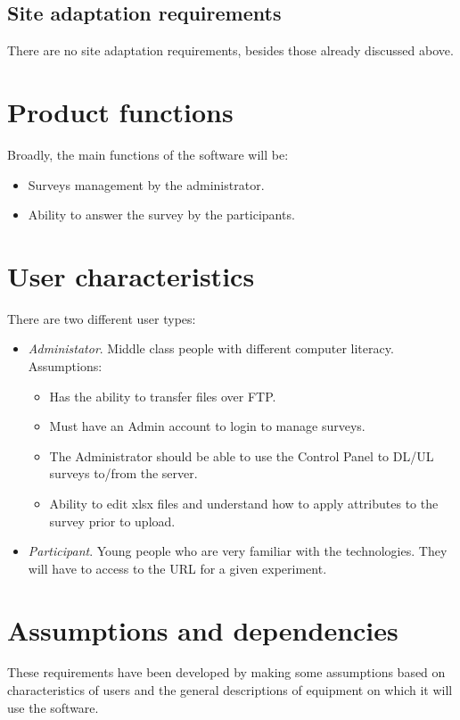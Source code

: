 \documentclass[a4paper,12pt,oneside]{report}
\begin{document}
\subsection{Site adaptation requirements}
There are no site adaptation requirements, besides those already discussed above.

\section{Product functions}
Broadly, the main functions of the software will be:
\begin{itemize}
\item Surveys management by the administrator.
\item Ability to answer the survey by the participants.
\end{itemize}
\section{User characteristics}
There are two different user types:
\begin{itemize}
	\item {\it Administator}. Middle class people with different computer literacy. Assumptions:
\begin{itemize}
	\item Has the ability to transfer files over FTP.
       	\item Must have an Admin account to login to manage surveys.
        \item The Administrator should be able to use the Control Panel to DL/UL surveys to/from the server.
        \item Ability to edit xlsx files and understand how to apply attributes to the survey prior to upload.
\end{itemize}
	\item {\it Participant}. Young people who are very familiar with the technologies. They will have to access to the URL for a given experiment.
\end{itemize}

\section{Assumptions and dependencies}

These requirements have been developed by making some assumptions based on characteristics of users and the general descriptions of equipment on which it will use the software. %
\end{document}
